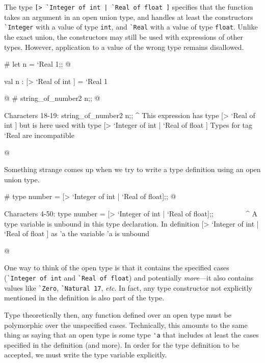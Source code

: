 The type \hbox{\lstinline/[> `Integer of int | `Real of float ]/} specifies that
the function takes an argument in an open union type, and handles at least the
constructors \hbox{\lstinline/`Integer/} with a value of type \hbox{\lstinline/int/}, and
\hbox{\lstinline/`Real/} with a value of type \hbox{\lstinline/float/}.  Unlike the exact
union, the constructors may still be used with expressions of other types.
However, application to a value of the wrong type remains disallowed.

\begin{ocaml}
# let n = `Real 1;;
@
\begin{topoutput}
val n : [> `Real of int ] = `Real 1
\end{topoutput}
@
# string_of_number2 n;;
@
\begin{topoutput}
Characters 18-19:
  string_of_number2 n;;
                    ^
This expression has type [> `Real of int ] but is here used with type
  [> `Integer of int | `Real of float ]
Types for tag `Real are incompatible
\end{topoutput}
@
\end{ocaml}


Something strange comes up when we try to write a type definition
using an open union type.

\label{keyword:as(types)}
\begin{ocaml}
# type number = [> `Integer of int | `Real of float];;
@
\begin{toperror}
Characters 4-50:
  type number = [> `Integer of int | `Real of float];;
      ^^^^^^^^^^^^^^^^^^^^^^^^^^^^^^^^^^^^^^^^^^^^^^
A type variable is unbound in this type declaration.
In definition [> `Integer of int | `Real of float ] as 'a
the variable 'a is unbound
\end{toperror}
@
\end{ocaml}
%
One way to think of the open type is that it contains the specified
cases (\hbox{\lstinline/`Integer of int/} and \hbox{\lstinline/`Real of float/}) and
potentially \emph{more}---it also contains values like \hbox{\lstinline/`Zero/},
\hbox{\lstinline/`Natural 17/}, \emph{etc}.  In fact, any type constructor
not explicitly mentioned in the definition is also part of the type.

Type theoretically then, any function defined over an open type must
be polymorphic over the unspecified cases.  Technically, this amounts
to the same thing as saying that an open type is some type
\hbox{\lstinline/'a/} that includes at least the cases specified in
the definition (and more).  In order for the type definition to be
accepted, we must write the type variable explicitly.

